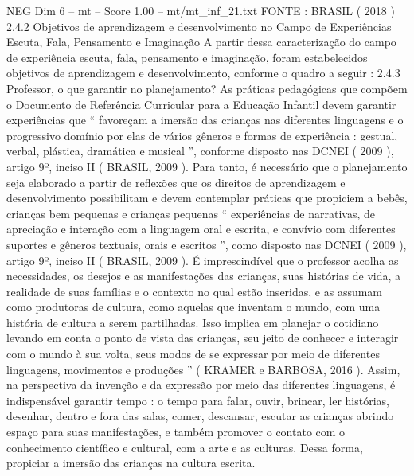 \begin{textsample}{NEG Dim 6 – mt – Score 1.00 – mt/mt\_inf\_21.txt}
FONTE : BRASIL ( 2018 ) 2.4.2 Objetivos de aprendizagem e desenvolvimento no Campo de Experiências Escuta, Fala, Pensamento e Imaginação A partir dessa caracterização do campo de experiência escuta, fala, pensamento e imaginação, foram estabelecidos objetivos de aprendizagem e desenvolvimento, conforme o quadro a seguir : 2.4.3 Professor, o que garantir no planejamento?
As práticas pedagógicas que compõem o Documento de Referência Curricular para a Educação Infantil devem garantir experiências que “ favoreçam a imersão das crianças nas diferentes linguagens e o progressivo domínio por elas de vários gêneros e formas de experiência : gestual, verbal, plástica, dramática e musical ”, conforme disposto nas DCNEI ( 2009 ), artigo 9º, inciso II ( BRASIL, 2009 ).
Para tanto, é necessário que o planejamento seja elaborado a partir de reflexões que os direitos de aprendizagem e desenvolvimento possibilitam e devem contemplar práticas que propiciem a bebês, crianças bem pequenas e crianças pequenas “ experiências de narrativas, de apreciação e interação com a linguagem oral e escrita, e convívio com diferentes suportes e gêneros textuais, orais e escritos ”, como disposto nas DCNEI ( 2009 ), artigo 9º, inciso II ( BRASIL, 2009 ).
É imprescindível que o professor acolha as necessidades, os desejos e as manifestações das crianças, suas histórias de vida, a realidade de suas famílias e o contexto no qual estão inseridas, e as assumam como produtoras de cultura, como aquelas que inventam o mundo, com uma história de cultura a serem partilhadas.
Isso implica em planejar o cotidiano levando em conta o ponto de vista das crianças, seu jeito de conhecer e interagir com o mundo à sua volta, seus modos de se expressar por meio de diferentes linguagens, movimentos e produções ” ( KRAMER e BARBOSA, 2016 ).
Assim, na perspectiva da invenção e da expressão por meio das diferentes linguagens, é indispensável garantir tempo : o tempo para falar, ouvir, brincar, ler histórias, desenhar, dentro e fora das salas, comer, descansar, escutar as crianças abrindo espaço para suas manifestações, e também promover o contato com o conhecimento científico e cultural, com a arte e as culturas.
Dessa forma, propiciar a imersão das crianças na cultura escrita.

\end{textsample}
